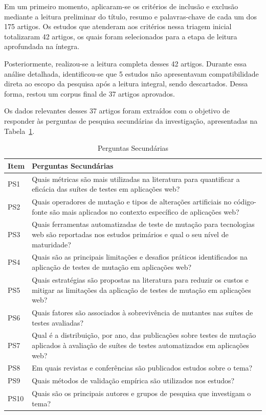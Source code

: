 Em um primeiro momento, aplicaram-se os critérios de inclusão e exclusão mediante a leitura preliminar do título, resumo e palavras-chave de cada um dos 175 artigos. Os estudos que atenderam aos critérios nessa triagem inicial totalizaram 42 artigos, os quais foram selecionados para a etapa de leitura aprofundada na íntegra.

Posteriormente, realizou-se a leitura completa desses 42 artigos. Durante essa análise detalhada, identificou-se que 5 estudos não apresentavam compatibilidade direta ao escopo da pesquisa após a leitura integral, sendo descartados. Dessa forma, restou um corpus final de 37 artigos aprovados.

Os dados relevantes desses 37 artigos foram extraídos com o objetivo de responder às perguntas de pesquisa secundárias da investigação, apresentadas na Tabela~\ref{tab:perguntas-secundarias}.

\begin{table}[htb]
    \centering
    \caption{Perguntas Secundárias}
    \label{tab:perguntas-secundarias}
    \begin{tabularx}{0.95\textwidth}{|l|X|}
        \hline
        \textbf{Item} & \textbf{Perguntas Secundárias} \\ \hline
        PS1 & Quais métricas são mais utilizadas na literatura para quantificar a eficácia das suítes de testes em aplicações web? \\ \hline
        PS2 & Quais operadores de mutação e tipos de alterações artificiais no código-fonte são mais aplicados no contexto específico de aplicações web? \\ \hline
        PS3 & Quais ferramentas automatizadas de teste de mutação para tecnologias web são reportadas nos estudos primários e qual o seu nível de maturidade? \\ \hline
        PS4 & Quais são as principais limitações e desafios práticos identificados na aplicação de testes de mutação em aplicações web? \\ \hline
        PS5 & Quais estratégias são propostas na literatura para reduzir os custos e mitigar as limitações da aplicação de testes de mutação em aplicações web? \\ \hline
        PS6 & Quais fatores são associados à sobrevivência de mutantes nas suítes de testes avaliadas? \\ \hline
        PS7 & Qual é a distribuição, por ano, das publicações sobre testes de mutação aplicados à avaliação de suítes de testes automatizados em aplicações web? \\ \hline
        PS8 & Em quais revistas e conferências são publicados estudos sobre o tema? \\ \hline
        PS9 & Quais métodos de validação empírica são utilizados nos estudos? \\ \hline
        PS10 & Quais são os principais autores e grupos de pesquisa que investigam o tema? \\ \hline
    \end{tabularx}
\end{table}

